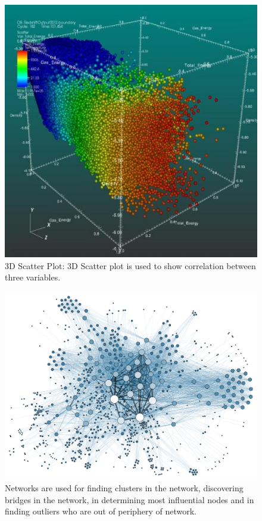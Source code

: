 \begin{figure}[htb]
      \includegraphics[width=\columnwidth]{images/Scatter_plot3D.jpg}
      \caption{3D Scatter Plot: 3D Scatter plot is used to show correlation between three variables.}
\end{figure}

\begin{figure}[htb]
      \includegraphics[width=\columnwidth]{images/Network.png}
      \caption{Networks are used for finding clusters in the network, discovering bridges in the network, in determining most influential nodes and in finding outliers who are out of periphery of network.}

\end{figure}

